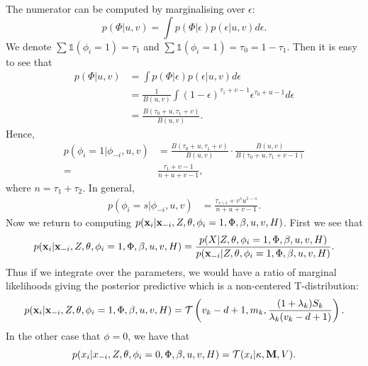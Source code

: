 \documentclass[12pt,english]{article}
\begin{document}
The numerator can be computed by marginalising over $\epsilon$:
\begin{equation}
p(\Phi|u,v) = \int p(\Phi | \epsilon)p(\epsilon|u,v) d\epsilon.
\end{equation}
We denote $\sum\mathds{1}(\phi_i = 1) = \tau_1$ and $\sum\mathds{1}(\phi_i = 1) = \tau_0 = 1 -\tau_1$. Then it is easy to see that
\begin{equation}
\begin{split}
p(\Phi|u,v) & = \int p(\Phi | \epsilon)p(\epsilon|u,v) d\epsilon\\
& = \frac{1}{B(u,v)}\int (1-\epsilon)^{\tau_1 + v - 1}\epsilon^{\tau_0 + u - 1} d\epsilon\\
& = \frac{B(\tau_0 + u,\tau_1 + v)}{B(u,v)}.
\end{split}
\end{equation}
Hence,
\begin{equation}
\begin{split}
p(\phi_i=1|\phi_{-i},u,v) &= \frac{B(\tau_0 + u,\tau_1 + v)}{B(u,v)} \cdot \frac{B(u,v)}{B(\tau_0 + u,\tau_1 + v -1)}\\
= & \frac{\tau_1 + v - 1}{n+u+v-1},
\end{split}
\end{equation}
where $n = \tau_1 + \tau_2$. In general,
\begin{equation}
\begin{split}
p(\phi_i=s|\phi_{-i},u,v) &=  \frac{\tau_{s\backslash i} + v^{s}u^{1-s}}{n+u+v-1}.
\end{split}
\end{equation}
Now we return to computing $p({\bf x}_i|{\bf x}_{-i},Z,\theta, \phi_i =1, \Phi, \beta, u,v, H)$. First we see that
\begin{equation}
p({\bf x}_i|{\bf x}_{-i},Z,\theta, \phi_i =1, \Phi, \beta, u,v, H)= \frac{p(X|Z,\theta, \phi_i =1, \Phi, \beta, u,v, H)}{p({\bf x}_{-i}|Z,\theta, \phi_i =1, \Phi, \beta, u,v, H)}.
\end{equation}
Thus if we integrate over the parameters, we would have a ratio of marginal likelihoods giving the posterior predictive which is a non-centered T-distribution:
\begin{equation}
p({\bf x}_i|{\bf x}_{-i},Z,\theta, \phi_i =1, \Phi, \beta, u,v, H) = \mathcal{T}\left( v_k - d + 1, m_k, \frac{(1+\lambda_k)S_k}{\lambda_k (v_k - d + 1)} \right).
\end{equation}
In the other case that $\phi = 0$, we have that
\begin{equation}
p(x_i|x_{-i},Z,\theta, \phi_i =0, \Phi, \beta, u,v, H) = \mathcal{T}(x_i|\kappa, {\bf M}, V).
\end{equation}
\end{document}
